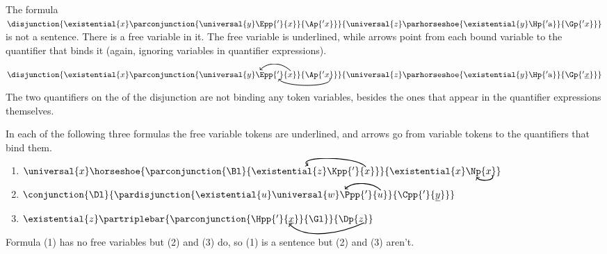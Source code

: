 \begin{majorILnc}{}
The formula $\disjunction{\existential{\variable{x}}\parconjunction{\universal{y}\Epp{'}{\variable{x}}}{\Ap{'\variable{x}}}}{\universal{\variable{z}}\parhorseshoe{\existential{\variable{y}}\Hp{'\constant{a}}}{\Gp{'\variable{x}}}}$ is not a sentence. There is a free variable in it. 
The free variable is underlined, while arrows point from each bound variable to the quantifier that binds it (again, ignoring variables in quantifier expressions). 

\smallskip
\begin{cenumerate}
\item $\disjunction{\existential{\variable{x}}\parconjunction{\universal{y}\Epp{'}{\variable{x}\NextLineRefC[black, distance=15, out=135, in=45]}}{\Ap{'\variable{x}}\NextLineRefH[black, distance=13, out=295, in=305]}}{\universal{\variable{z}}\parhorseshoe{\existential{\variable{y}}\Hp{'\constant{a}}}{\Gp{'\underline{\variable{x}}}}}$
\end{cenumerate}

\medskip
\noindent{}The two quantifiers on the  of the disjunction are not binding any token variables, besides the ones that appear in the quantifier expressions themselves.
\end{majorILnc}
\begin{majorILnc}{}
In each of the following three formulas the free variable tokens are underlined, and arrows go from variable tokens to the quantifiers that bind them.

\smallskip
\begin{enumerate}[label=(\arabic*), leftmargin=1.85\parindent,
labelindent=.35\parindent, labelsep=*, itemsep=8pt]
\item $\universal{\variable{x}}\horseshoe{\parconjunction{\Bl}{\existential{\variable{z}}\Kpp{'}{\variable{x}\NextLineRefF[black, distance=17, out=135, in=145]}}}{\existential{\variable{x}}\Np{\variable{x}}\NextLineRefK[black, out=-50, in=-50]}$
\item $\conjunction{\Dl}{\pardisjunction{\existential{\variable{u}}\universal{\variable{w}}\Ppp{'}{\variable{u}\NextLineRefC[black, distance=12, out=135, in=45]}}{\Cpp{'}{\underline{\variable{y}}}}}$
\item $\existential{\variable{z}}\partriplebar{\parconjunction{\Hpp{'}{\underline{\variable{x}}}}{\Gl}}{\Dp{\variable{z}}\NextLineRefI[black, distance=25, out=205, in=315]}$
\end{enumerate}

\medskip
\noindent{}Formula (1) has no free variables but (2) and (3) do, so (1) is a sentence but (2) and (3) aren't. 
\end{majorILnc}

